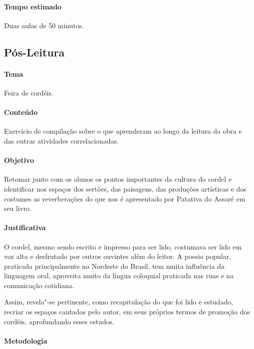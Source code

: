 \documentclass[12pt]{extarticle}
\begin{document}
{\begin{enumerate}
\end{enumerate}

\paragraph{Tempo estimado} Duas aulas de 50 minutos. 


\subsection{Pós-Leitura}

\paragraph{Tema} Feira de cordéis.

\paragraph{Conteúdo} Exercício de compilação sobre o que aprenderam ao 
longo da leitura da obra e das outras atividades correlacionadas. 

\paragraph{Objetivo} Retomar junto com os alunos os pontos importantes 
da cultura do cordel e identificar nos espaços dos sertões, das paisagens, 
das produções artísticas e dos costumes as reverberações do que nos 
é apresentado por Patativa do Assaré em seu livro. 

\paragraph{Justificativa} O cordel, mesmo sendo escrito e impresso para 
ser lido, costumava ser lido em voz alta e desfrutado por outros ouvintes
além do leitor. A poesia popular, praticada principalmente
no Nordeste do Brasil, tem muita influência da linguagem
oral, aproveita muito da língua coloquial praticada nas ruas
e na comunicação cotidiana.

Assim, revela"-se pertinente, como recapitulação do que foi lido e 
estudado, recriar os espaços cantados pelo autor, em seus próprios termos 
de promoção dos cordéis, aprofundando esses estudos.

\paragraph{Metodologia}

}
\end{document}

